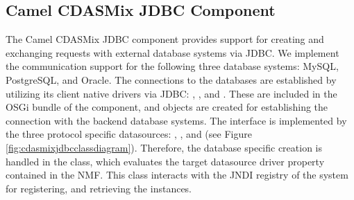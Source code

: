 \subsection{Camel CDASMix JDBC Component}

The Camel CDASMix JDBC component provides support for creating and exchanging requests with external database systems via \ac{JDBC}. We implement the communication support for the following three database systems: MySQL, PostgreSQL, and Oracle. The connections to the databases are established by utilizing its client native drivers via \ac{JDBC}: , , and . These are included in the \ac{OSGi} bundle of the  component, and  objects are created for establishing the connection with the backend database systems. The  interface is implemented by the three protocol specific datasources: , , and  (see Figure \ref{fig:cdasmixjdbcclassdiagram}). Therefore, the database specific  creation is handled in the  class, which evaluates the target datasource driver property contained in the \ac{NMF}. This class interacts with the \ac{JNDI} registry of the system for registering, and retrieving the  instances.

